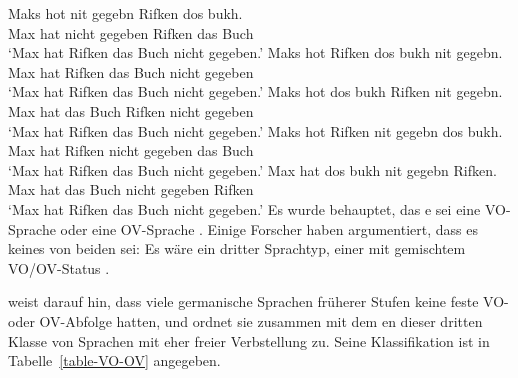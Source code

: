 \eal
\label{ex-yiddish-vo-ov}
\ex
\gll Maks hot nit gegebn Rifken dos bukh.\\
     Max  hat nicht gegeben  Rifken das Buch\\\yiddish
\glt `Max hat Rifken das Buch nicht gegeben.'
\ex
\gll Maks hot Rifken dos bukh nit gegebn.\\
     Max  hat Rifken das Buch nicht gegeben\\
\glt `Max hat Rifken das Buch nicht gegeben.'
\ex
\gll Maks hot dos bukh Rifken nit gegebn.\\
     Max  hat das Buch Rifken nicht gegeben\\
\glt `Max hat Rifken das Buch nicht gegeben.'
\ex
\gll Maks hot Rifken nit gegebn dos bukh.\\
     Max  hat Rifken nicht gegeben  das Buch\\
\glt `Max hat Rifken das Buch nicht gegeben.'
\ex
\glt Max hat dos bukh nit gegebn Rifken.\\
     Max hat das Buch nicht gegeben  Rifken\\
\glt `Max hat Rifken das Buch nicht gegeben.'
\zl
Es wurde behauptet, das e sei eine VO-Sprache
\parencites[]{dBMvW86a}[]{Diesing97a}{Sadock98a} oder eine OV-Sprache
\parencites{Hall79a}{Geilfuss90a-u}[Kapitel~2]{Vikner2001a}. Einige Forscher haben argumentiert, dass es
keines von beiden sei: Es wäre ein dritter Sprachtyp, einer mit gemischtem VO/OV-Status \parencites{Santorini93a}[]{Schallert2007a}[]{Haider2010a}{Haider2020a}.

\citet[Abschnitt~2.5]{Schallert2007a} weist darauf hin, dass viele germanische Sprachen früherer Stufen keine
feste VO- oder OV-Abfolge hatten, und ordnet sie zusammen mit dem en dieser dritten Klasse von Sprachen mit
eher freier Verbstellung zu. Seine Klassifikation ist in Tabelle~\ref{table-VO-OV} angegeben.
 
